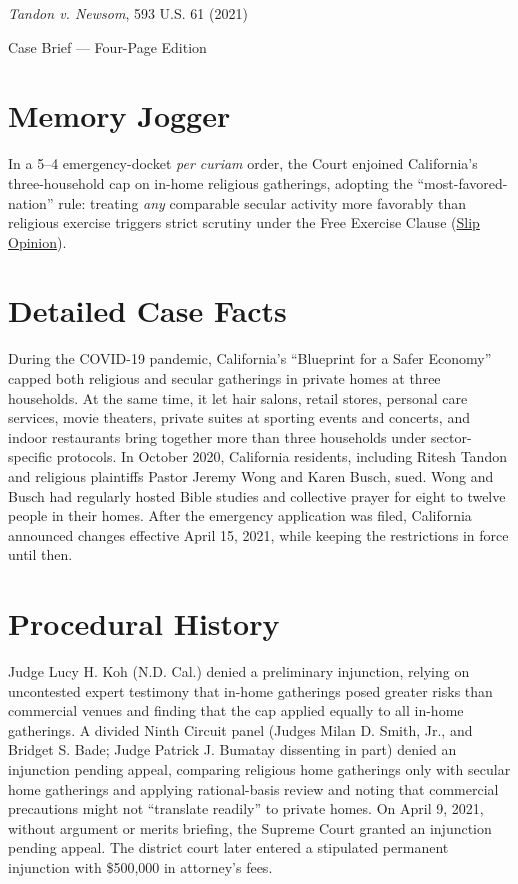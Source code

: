 \documentclass[12pt]{article}
\begin{document}
\begin{center}
{\LARGE \textit{Tandon v. Newsom}, 593 U.S. 61 (2021)\par}
\vspace{0.8em}
{\large Case Brief --- Four-Page Edition\par}
\end{center}
\vspace{1em}

\section{Memory Jogger}

In a 5--4 emergency-docket \textit{per curiam} order, the Court enjoined California's three-household cap on in-home religious gatherings, adopting the ``most-favored-nation'' rule: treating \textit{any} comparable secular activity more favorably than religious exercise triggers strict scrutiny under the Free Exercise Clause (\href{https://www.supremecourt.gov/opinions/20pdf/20a151_4g15.pdf}{Slip Opinion}).

\section{Detailed Case Facts}

During the COVID-19 pandemic, California's ``Blueprint for a Safer Economy'' capped both religious and secular gatherings in private homes at three households. At the same time, it let hair salons, retail stores, personal care services, movie theaters, private suites at sporting events and concerts, and indoor restaurants bring together more than three households under sector-specific protocols. In October 2020, California residents, including Ritesh Tandon and religious plaintiffs Pastor Jeremy Wong and Karen Busch, sued. Wong and Busch had regularly hosted Bible studies and collective prayer for eight to twelve people in their homes. After the emergency application was filed, California announced changes effective April 15, 2021, while keeping the restrictions in force until then.

\section{Procedural History}

Judge Lucy H. Koh (N.D. Cal.) denied a preliminary injunction, relying on uncontested expert testimony that in-home gatherings posed greater risks than commercial venues and finding that the cap applied equally to all in-home gatherings. A divided Ninth Circuit panel (Judges Milan D. Smith, Jr., and Bridget S. Bade; Judge Patrick J. Bumatay dissenting in part) denied an injunction pending appeal, comparing religious home gatherings only with secular home gatherings and applying rational-basis review and noting that commercial precautions might not ``translate readily'' to private homes. On April 9, 2021, without argument or merits briefing, the Supreme Court granted an injunction pending appeal. The district court later entered a stipulated permanent injunction with \$500,000 in attorney's fees.
\end{document}
